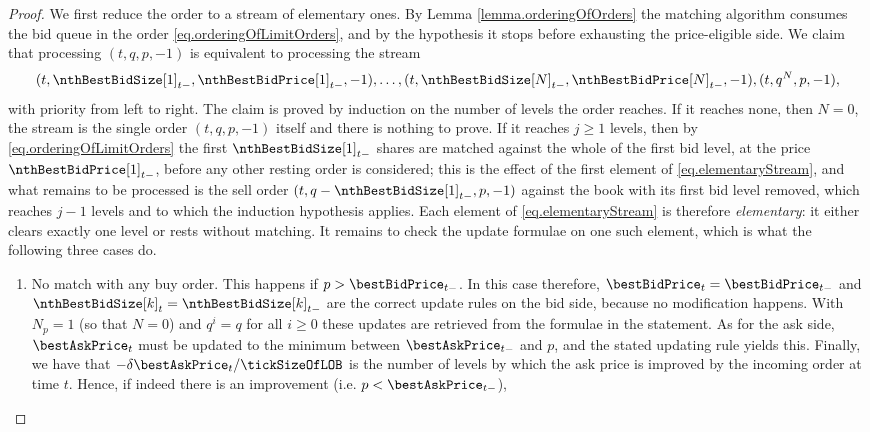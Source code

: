 \begin{proof}
 We first reduce the order to a stream of elementary ones.
 By Lemma \ref{lemma.orderingOfOrders} the matching algorithm consumes the bid queue in the
 order \eqref{eq.orderingOfLimitOrders},
 and by the hypothesis it stops before exhausting the price-eligible side.
 We claim that processing $(t,q,p,-1)$ is equivalent to processing the stream
 \begin{equation}\label{eq.elementaryStream}
  (t,\nthBestBidSize[1]_{t-},\nthBestBidPrice[1]_{t-},-1), \dots,
  (t,\nthBestBidSize[N]_{t-},\nthBestBidPrice[N]_{t-},-1),
  (t,q^{N}, p, -1),
 \end{equation}
 with priority from left to right.
 The claim is proved by induction on the number of levels the order reaches.
 If it reaches none, then $N=0$, the stream is the single order $(t,q,p,-1)$ itself
 and there is nothing to prove.
 If it reaches $j \geq 1$ levels, then by \eqref{eq.orderingOfLimitOrders} the first
 $\nthBestBidSize[1]_{t-}$ shares are matched against the whole of the first bid level,
 at the price $\nthBestBidPrice[1]_{t-}$,
 before any other resting order is considered;
 this is the effect of the first element of \eqref{eq.elementaryStream},
 and what remains to be processed is the sell order
 $(t, q - \nthBestBidSize[1]_{t-}, p, -1)$
 against the book with its first bid level removed,
 which reaches $j-1$ levels and to which the induction hypothesis applies.
 Each element of \eqref{eq.elementaryStream} is therefore \emph{elementary}:
 it either clears exactly one level or rests without matching.
 It remains to check the update formulae on one such element,
 which is what the following three cases do.
 \begin{enumerate}[label={\emph{\roman{*}}.}]
  \item No match with any buy order.
  This happens if $p>\bestBidPrice_{t-}$.
  In this case therefore,
  $\bestBidPrice_t = \bestBidPrice_{t-}$ and $\nthBestBidSize[k]_{t} = \nthBestBidSize[k]_{t-}$
  are the correct update rules on the bid side, because no modification happens.
  With $N_p=1$ (so that $N=0$) and $q^i=q$ for all $i\geq 0$
  these updates are retrieved from the formulae in the statement.
  As for the ask side,
  $\bestAskPrice_t$ must be updated to the minimum between $\bestAskPrice_{t-}$ and $p$,
  and the stated updating rule yields this.
  Finally, we have that $-\delta\bestAskPrice_t/\tickSizeOfLOB$ is the number of levels
  by which the ask price is improved by the incoming order at time $t$.
  Hence, if indeed there is an improvement (i.e. $p<\bestAskPrice_{t-}$),

\end{enumerate}
\end{proof}
